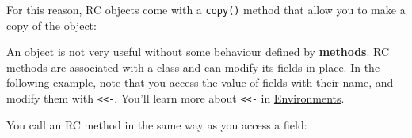 For this reason, RC objects come with a \texttt{copy()} method that
allow you to make a copy of the object:

\begin{Shaded}
\begin{Highlighting}[]
\StringTok{ }\NormalTok{()}
\StringTok{ }
\end{Highlighting}
\end{Shaded}

An object is not very useful without some behaviour defined by
\textbf{methods}. RC methods are associated with a class and can modify
its fields in place. In the following example, note that you access the
value of fields with their name, and modify them with
\texttt{\textless{}\textless{}-}. You'll learn more about
\texttt{\textless{}\textless{}-} in \hyperref[binding]{Environments}.
  \indexc{<<-}

\begin{Shaded}
\begin{Highlighting}[]
\StringTok{ }\NormalTok{(}\NormalTok{,}
   \NormalTok{(} \NormalTok{),}
   \NormalTok{(}
     
      \StringTok{ }\StringTok{ }
    \NormalTok{\},}
     
      \StringTok{ }\StringTok{ }
    \NormalTok{\}}
  \NormalTok{)}
\NormalTok{)}
\end{Highlighting}
\end{Shaded}

You call an RC method in the same way as you access a field:

\begin{Shaded}
\begin{Highlighting}[]
\StringTok{ }\NormalTok{(} \NormalTok{)}
\NormalTok{(}\NormalTok{)}
\end{Highlighting}
\end{Shaded}

